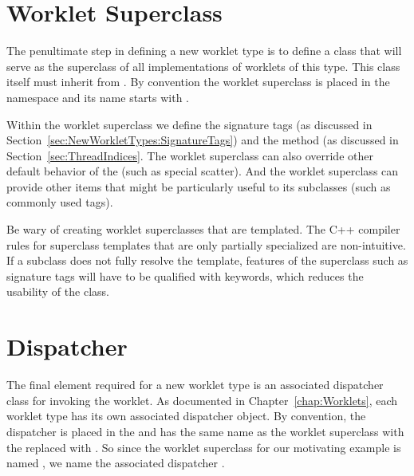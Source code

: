 
\section{Worklet Superclass}
\label{sec:NewWorkletTypes:WorkletSuperclass}
\label{sec:WorkletSuperclass}

The penultimate step in defining a new worklet type is to define a class that will serve as the superclass of all implementations of worklets of this type.
This class itself must inherit from .
By convention the worklet superclass is placed in the \vtkmworklet{} namespace and its name starts with .

Within the worklet superclass we define the signature tags (as discussed in Section~\ref{sec:NewWorkletTypes:SignatureTags}) and the  method (as discussed in Section~\ref{sec:ThreadIndices}.
The worklet superclass can also override other default behavior of the  (such as special scatter).
And the worklet superclass can provide other items that might be particularly useful to its subclasses (such as commonly used tags).


\begin{commonerrors}
  Be wary of creating worklet superclasses that are templated.
  The C++ compiler rules for superclass templates that are only partially specialized are non-intuitive.
  If a subclass does not fully resolve the template, features of the superclass such as signature tags will have to be qualified with  keywords, which reduces the usability of the class.
\end{commonerrors}

\section{Dispatcher}
\label{sec:NewWorkletTypes:Dispatcher}


The final element required for a new worklet type is an associated dispatcher class for invoking the worklet.
As documented in Chapter~\ref{chap:Worklets}, each worklet type has its own associated dispatcher object.
By convention, the dispatcher is placed in the \vtkmworklet{} and has the same name as the worklet superclass with the  replaced with .
So since the worklet superclass for our motivating example is named , we name the associated dispatcher .


